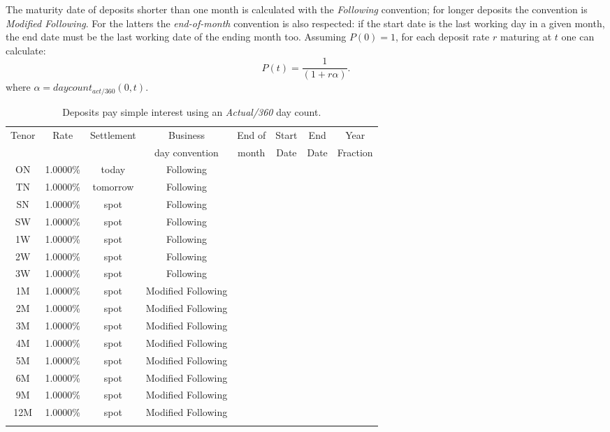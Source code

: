 \documentclass[11pt,reqno]{amsart}
\begin{document}
The maturity date of deposits shorter than one month is calculated with the {\it Following} convention; for longer deposits the convention is {\it Modified Following}. For the latters the {\it end-of-month} convention is also respected: if the start date is the last working day in a given month, the end date must be the last working date of the ending month too. 
Assuming $P(0)=1$, for each deposit rate $r$ maturing at $t$ one can calculate:
\begin{equation}
P(t) = \frac{1}{(1 + r \alpha)}.
\label{eqn:deposit}
\end{equation}
where $\alpha = daycount_{act/360}(0,t)$.
\begin{table}[tbp]
\label{tab:deposits}
\begin{tabular}{cccccccc}
Tenor & Rate & Settlement & Business       & End of & Start & End  & Year \\
      &      &            & day convention & month   & Date  & Date & Fraction \\
ON & 1.0000\% & today & Following &  &  \\
TN & 1.0000\% & tomorrow & Following &  &  \\
SN & 1.0000\% & spot & Following &  &  \\
SW & 1.0000\% & spot & Following &  &  \\
1W & 1.0000\% & spot & Following &  &  \\
2W & 1.0000\% & spot & Following &  &  \\
3W & 1.0000\% & spot & Following &  &  \\
1M & 1.0000\% & spot & Modified Following &  &  \\
2M & 1.0000\% & spot & Modified Following &  &  \\
3M & 1.0000\% & spot & Modified Following &  &  \\
4M & 1.0000\% & spot & Modified Following &  &  \\
5M & 1.0000\% & spot & Modified Following &  &  \\
6M & 1.0000\% & spot & Modified Following &  &  \\
9M & 1.0000\% & spot & Modified Following &  &  \\
12M & 1.0000\% & spot & Modified Following &  &  \\
&  &  &  &  &
\end{tabular}%
\caption{Deposits pay simple interest using an \emph{Actual/360} day count.}
\end{table}
\end{document}
